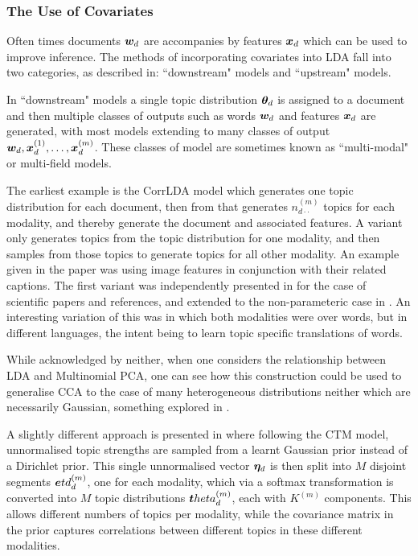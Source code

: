 

\subsubsection{The Use of Covariates}
Often times documents $\bm w_d$ are accompanies by features $\bm x_d$ which can be used to improve inference. The methods of incorporating covariates into LDA fall into two categories, as described in\cite{Mimno2008}: ``downstream" models and ``upstream" models.

In ``downstream" models a single topic distribution ${ \bm \theta_d }$ is assigned to a document and then multiple classes of outputs such as words $\bm w_d$ and features $\bm x_d$ are generated, with most models extending to many classes of output $\bm w_d, \bm x_d^{(1)}, \ldots, \bm x_d^{(m)}$. These classes of model are sometimes known as ``multi-modal"\cite{Virtanen2012a} or multi-field\cite{Salomatin2009} models.

The earliest example is the CorrLDA model\cite{Blei2003} which generates one topic distribution for each document, then from that generates $n^{(m)}_{d\cdot\cdot}$ topics for each modality, and thereby generate the document and associated features. A variant only generates topics from the topic distribution for one modality, and then samples from those topics to generate topics for all other modality. An example given in the paper was using image features in conjunction with their related captions. The first variant was independently presented in \cite{Erosheva2004} for the case of scientific papers and references, and extended to the non-parameteric case in \cite{Yakhnenko2009}. An interesting variation of this was \cite{Zhao2001} in which both modalities were over words, but in different languages, the intent being to learn topic specific translations of words.

While acknowledged by neither, when one considers the relationship between LDA and Multinomial PCA\cite{Buntine2002}, one can see how this construction could be used to generalise CCA to the case of many heterogeneous distributions neither which are necessarily Gaussian, something explored in \cite{Virtanen2012a}. 

A slightly different approach is presented in \cite{Salomatin2009} where following the CTM model\cite{Blei2006}, unnormalised topic strengths are sampled from a learnt Gaussian prior instead of a Dirichlet prior. This single unnormalised vector $\bm \eta_d$ is then split into $M$ disjoint segments $\bm etd_d^{(m)}$, one for each modality, which via a softmax transformation is converted into $M$ topic distributions $\bm theta_d^{(m)}$, each with $K^{(m)}$ components. This allows different numbers of topics per modality, while the covariance matrix in the prior captures correlations between different topics in these different modalities.

